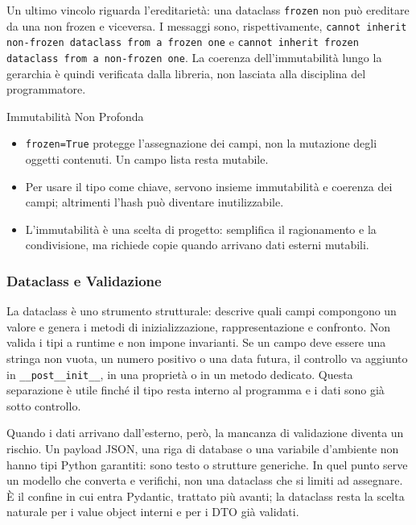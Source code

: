 \documentclass[12pt]{extarticle}
\begin{document}
\noindent Un ultimo vincolo riguarda l'ereditarietà: una dataclass \texttt{frozen} non può ereditare da una non frozen e viceversa. I messaggi sono, rispettivamente, \texttt{cannot inherit non-frozen dataclass from a frozen one} e \texttt{cannot inherit frozen dataclass from a non-frozen one}. La coerenza dell'immutabilità lungo la gerarchia è quindi verificata dalla libreria, non lasciata alla disciplina del programmatore.

\begin{cbox}{Immutabilità Non Profonda}
\begin{itemize}
    \item \texttt{frozen=True} protegge l'assegnazione dei campi, non la mutazione degli oggetti contenuti. Un campo lista resta mutabile.
    \item Per usare il tipo come chiave, servono insieme immutabilità e coerenza dei campi; altrimenti l'hash può diventare inutilizzabile.
    \item L'immutabilità è una scelta di progetto: semplifica il ragionamento e la condivisione, ma richiede copie quando arrivano dati esterni mutabili.
\end{itemize}
\end{cbox}

\subsubsection{Dataclass e Validazione}

\noindent La dataclass è uno strumento strutturale: descrive quali campi compongono un valore e genera i metodi di inizializzazione, rappresentazione e confronto. Non valida i tipi a runtime e non impone invarianti. Se un campo deve essere una stringa non vuota, un numero positivo o una data futura, il controllo va aggiunto in \texttt{\_\_post\_\_init\_\_}, in una proprietà o in un metodo dedicato. Questa separazione è utile finché il tipo resta interno al programma e i dati sono già sotto controllo.

\noindent Quando i dati arrivano dall'esterno, però, la mancanza di validazione diventa un rischio. Un payload JSON, una riga di database o una variabile d'ambiente non hanno tipi Python garantiti: sono testo o strutture generiche. In quel punto serve un modello che converta e verifichi, non una dataclass che si limiti ad assegnare. È il confine in cui entra Pydantic, trattato più avanti; la dataclass resta la scelta naturale per i value object interni e per i DTO già validati.
\end{document}
